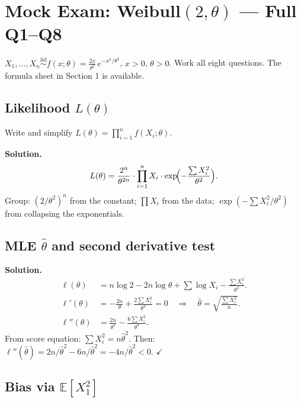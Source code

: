 \documentclass[11pt,a4paper]{article}
\newcommand{\iid}{\overset{\text{iid}}{\sim}}
\newcommand{\E}{\mathbb{E}}
\begin{document}
\newpage
\section{Mock Exam: Weibull$(2,\theta)$ — Full Q1--Q8}

\begin{tcolorbox}[questionbox, title={Instructions}]
$X_1,\ldots,X_n \iid f(x;\theta) = \frac{2x}{\theta^2}\,e^{-x^2/\theta^2}$, $x>0$, $\theta>0$. Work all eight questions. The formula sheet in Section 1 is available.
\end{tcolorbox}

\subsection{Likelihood $L(\theta)$}

Write and simplify $L(\theta) = \prod_{i=1}^n f(X_i;\theta)$.

\vspace{120pt}

\textbf{Solution.}
\[
  L(\theta) = \frac{2^n}{\theta^{2n}}\cdot\prod_{i=1}^n X_i\cdot\exp\!\Bigl(-\frac{\textstyle\sum X_i^2}{\theta^2}\Bigr).
\]
Group: $(2/\theta^2)^n$ from the constant; $\prod X_i$ from the data; $\exp(-\sum X_i^2/\theta^2)$ from collapsing the exponentials.

\subsection{MLE $\hat\theta$ and second derivative test}

\vspace{120pt}

\textbf{Solution.}
\begin{align*}
  \ell(\theta) &= n\log 2 - 2n\log\theta + \sum\log X_i - \frac{\sum X_i^2}{\theta^2}.\\
  \ell'(\theta) &= -\frac{2n}{\theta} + \frac{2\sum X_i^2}{\theta^3} = 0
  \quad\Longrightarrow\quad \hat\theta = \sqrt{\frac{\sum X_i^2}{n}}.\\
  \ell''(\theta) &= \frac{2n}{\theta^2} - \frac{6\sum X_i^2}{\theta^4}.
\end{align*}
From score equation: $\sum X_i^2 = n\hat\theta^2$. Then:
$\ell''(\hat\theta) = 2n/\hat\theta^2 - 6n/\hat\theta^2 = -4n/\hat\theta^2 < 0$. $\checkmark$

\subsection{Bias via $\E[X_1^2]$}
\end{document}
